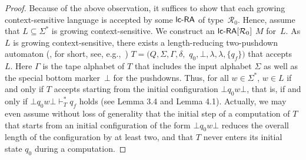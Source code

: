 \noindent
\begin{proof}
Because of the above observation, it suffices to show that each growing context-sensitive language is accepted by some $\lcRA$ of type~$\mathcal{R}_0$. Hence, assume that $L\subseteq\Sigma^*$ is growing context-sensitive. We construct an $\lcRA[0]$ $M$ for~$L$. As $L$ is growing context-sensitive, there exists a length-reducing two-pushdown automaton (\TPDA, for short, see, e.g.,~\cite{Buntrock19981}) $T = (Q,\Sigma,\Gamma,\delta,$ $q_0,\bot,\lambda,\lambda,\{q_f\})$ that accepts~$L$. Here $\Gamma$ is the tape alphabet of $T$ that includes the input alphabet $\Sigma$ as well as the special bottom marker~$\bot$ for the pushdowns. Thus, for all $w\in\Sigma^*$, $w\in L$ if and only if $T$ accepts starting from the initial configuration $\bot q_0w\bot$, that is, if and only if $\bot q_0 w\bot\vdash_T^* q_f$ holds (see \cite{N2005} Lemma 3.4 and Lemma 4.1). Actually, we may even assume without loss of generality that the initial step of a computation of $T$ that starts from an initial configuration of the form $\bot q_0w\bot$ reduces the overall length of the configuration by at least two, and that $T$ never enters its initial state $q_0$ during a computation.


\end{proof}

